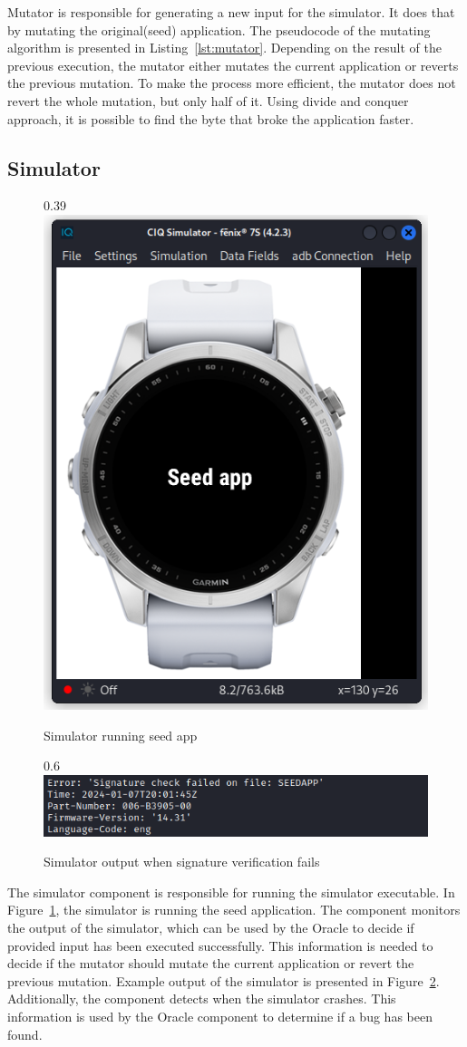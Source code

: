 Mutator is responsible for generating a new input for the simulator.
It does that by mutating the original(seed) application.
The pseudocode of the mutating algorithm is presented in Listing~\ref{lst:mutator}.
Depending on the result of the previous execution, the mutator either mutates the current application or reverts the previous mutation.
To make the process more efficient, the mutator does not revert the whole mutation, but only half of it.
Using divide and conquer approach, it is possible to find the byte that broke the application faster.


\subsection*{Simulator}
    \begin{figure}[b]{0.39\textwidth}
        \centering
        \includegraphics[width=0.39\linewidth]{../../images/simulator-seed-app}
        \caption{Simulator running seed app}
        \label{fig:simulator-seed-app}
    \end{figure}
    \begin{figure}[b]{0.6\textwidth}
        \centering
        \includegraphics[width=0.6\linewidth]{../../images/simulator-signature-failed}
        \caption{Simulator output when signature verification fails}
        \label{fig:simulator-signature-failed}
    \end{figure}
The simulator component is responsible for running the simulator executable.
In Figure~\ref{fig:simulator-seed-app}, the simulator is running the seed application.
The component monitors the output of the simulator, which can be used by the Oracle to decide if provided input has been executed successfully.
This information is needed to decide if the mutator should mutate the current application or revert the previous mutation.
Example output of the simulator is presented in Figure~\ref{fig:simulator-signature-failed}.
Additionally, the component detects when the simulator crashes.
This information is used by the Oracle component to determine if a bug has been found.

